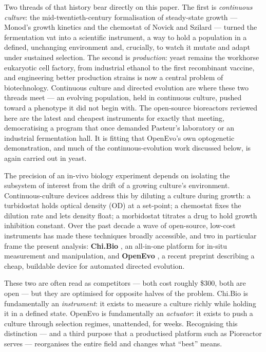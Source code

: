 \documentclass[11pt,a4paper]{article}
\begin{document}
Two threads of that history bear directly on this paper. The first is \emph{continuous culture}:
the mid-twentieth-century formalisation of steady-state growth --- Monod's growth kinetics
\cite{monod1949} and the chemostat of Novick and Szilard \cite{novick1950} --- turned the
fermentation vat into a scientific instrument,
a way to hold a population in a defined, unchanging environment and, crucially, to watch it mutate
and adapt under sustained selection. The second is \emph{production}: yeast
remains the workhorse eukaryotic cell factory, from industrial ethanol to the first recombinant
vaccine, and engineering better production strains is now a central problem of biotechnology.
Continuous culture and directed evolution are where these two threads meet --- an evolving
population, held in continuous culture, pushed toward a phenotype it did not begin with. The
open-source bioreactors reviewed here are the latest and cheapest instruments for exactly that
meeting, democratising a program that once demanded Pasteur's laboratory or an industrial
fermentation hall. It is fitting that OpenEvo's own optogenetic demonstration, and much of the
continuous-evolution work discussed below, is again carried out in yeast.

The precision of an in-vivo biology experiment depends on isolating the subsystem of interest
from the drift of a growing culture's environment. Continuous-culture devices address this by
diluting a culture during growth: a turbidostat holds optical density (OD) at a set-point; a
chemostat fixes the dilution rate and lets density float; a morbidostat titrates a drug to
hold growth inhibition constant. Over the past decade a wave of open-source, low-cost
instruments has made these techniques broadly accessible, and two in particular frame the
present analysis: \textbf{Chi.Bio} \cite{steel2020chibio}, an all-in-one platform for in-situ
measurement and manipulation, and \textbf{OpenEvo} \cite{cocioba2026openevo}, a recent
preprint describing a cheap, buildable device for automated directed evolution.

These two are often read as competitors --- both cost roughly \$300, both are open --- but
they are optimised for opposite halves of the problem. Chi.Bio is fundamentally an
\emph{instrument}: it exists to measure a culture richly while holding it in a defined state.
OpenEvo is fundamentally an \emph{actuator}: it exists to push a culture through selection
regimes, unattended, for weeks. Recognising this distinction --- and a third purpose that a
productised platform such as Pioreactor serves --- reorganises the entire field and changes
what ``best'' means.
\end{document}
